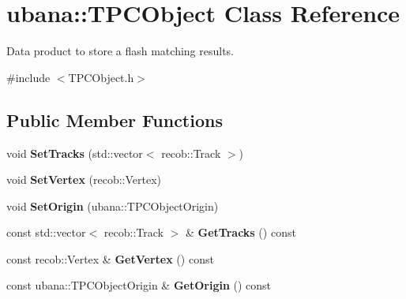 \hypertarget{classubana_1_1TPCObject}{\section{ubana\-:\-:\-T\-P\-C\-Object \-Class \-Reference}
\label{classubana_1_1TPCObject}
}


\-Data product to store a flash matching results.  




{\ttfamily \#include $<$\-T\-P\-C\-Object.\-h$>$}

\subsection*{\-Public \-Member \-Functions}
\begin{DoxyCompactItemize}
\item 
\hypertarget{classubana_1_1TPCObject_a0766c8648ada3d539b474e40a107d8c1}{void {\bfseries \-Set\-Tracks} (std\-::vector$<$ recob\-::\-Track $>$)}\label{classubana_1_1TPCObject_a0766c8648ada3d539b474e40a107d8c1}

\item 
\hypertarget{classubana_1_1TPCObject_a1fed8d9f87fc301a8cbee484a8434a05}{void {\bfseries \-Set\-Vertex} (recob\-::\-Vertex)}\label{classubana_1_1TPCObject_a1fed8d9f87fc301a8cbee484a8434a05}

\item 
\hypertarget{classubana_1_1TPCObject_ad4946cb455555486b701dd1301a26f56}{void {\bfseries \-Set\-Origin} (ubana\-::\-T\-P\-C\-Object\-Origin)}\label{classubana_1_1TPCObject_ad4946cb455555486b701dd1301a26f56}

\item 
\hypertarget{classubana_1_1TPCObject_a44cc29b00093d89d9f7fe834570d77be}{const std\-::vector$<$ recob\-::\-Track $>$ \& {\bfseries \-Get\-Tracks} () const }\label{classubana_1_1TPCObject_a44cc29b00093d89d9f7fe834570d77be}

\item 
\hypertarget{classubana_1_1TPCObject_a3845ae1b31ab6590c5597d157dc01e6a}{const recob\-::\-Vertex \& {\bfseries \-Get\-Vertex} () const }\label{classubana_1_1TPCObject_a3845ae1b31ab6590c5597d157dc01e6a}

\item 
\hypertarget{classubana_1_1TPCObject_a253b4e844b4de1333fa80263c03fceb7}{const ubana\-::\-T\-P\-C\-Object\-Origin \& {\bfseries \-Get\-Origin} () const }\label{classubana_1_1TPCObject_a253b4e844b4de1333fa80263c03fceb7}

\end{DoxyCompactItemize}


